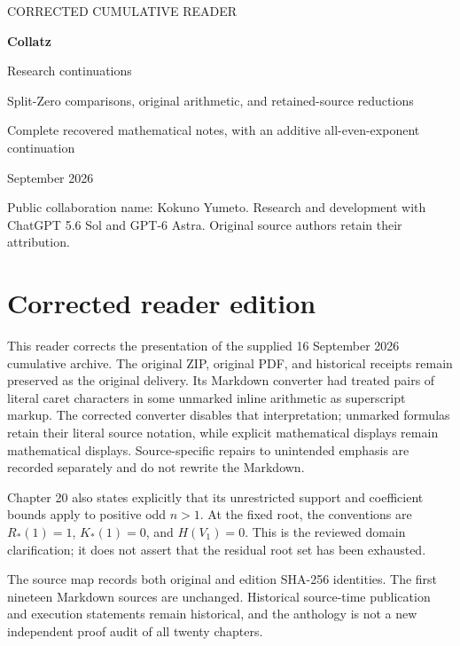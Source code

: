 \documentclass[11pt,oneside]{book}
\begin{document}
\frontmatter
\begin{titlepage}
\vspace*{20mm}
{\sffamily\large CORRECTED CUMULATIVE READER\par}
\vspace{12mm}
{\Huge\bfseries Collatz\par}
\vspace{3mm}
{\LARGE Research continuations\par}
\vspace{14mm}
{\Large Split-Zero comparisons, original arithmetic, and retained-source reductions\par}
\vspace{18mm}
{\large Complete recovered mathematical notes, with an additive all-even-exponent continuation\par}
\vfill
{ September 2026\par}
{\small Public collaboration name: Kokuno Yumeto. Research and development with ChatGPT 5.6 Sol and GPT-6 Astra. Original source authors retain their attribution.\par}
\end{titlepage}
\chapter*{Corrected reader edition}
This reader corrects the presentation of the supplied 16 September 2026
cumulative archive. The original ZIP, original PDF, and historical receipts
remain preserved as the original delivery. Its Markdown converter had treated
pairs of literal caret characters in some unmarked inline arithmetic as
superscript markup. The corrected converter disables that interpretation;
unmarked formulas retain their literal source notation, while explicit
mathematical displays remain mathematical displays. Source-specific repairs to
unintended emphasis are recorded separately and do not rewrite the Markdown.

Chapter 20 also states explicitly that its unrestricted support and coefficient
bounds apply to positive odd $n>1$. At the fixed root, the conventions are
$R_*(1)=1$, $K_*(1)=0$, and $H(V_1)=0$. This is the reviewed domain clarification;
it does not assert that the residual root set has been exhausted.

The source map records both original and edition SHA-256 identities. The first
nineteen Markdown sources are unchanged. Historical source-time publication and
execution statements remain historical, and the anthology is not a new
independent proof audit of all twenty chapters.
\end{document}
